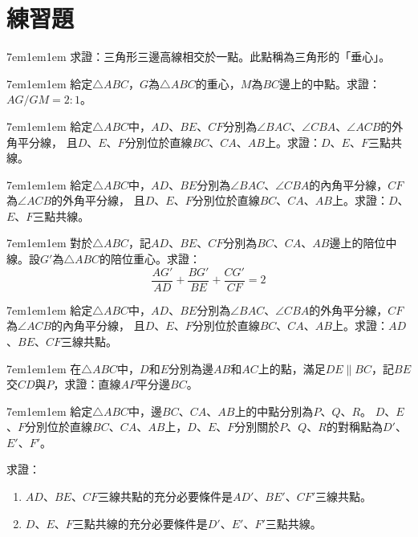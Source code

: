 \documentclass[12pt]{article}
\begin{document}
\section{練習題}
\begin{mybox}[Problem 1]{7em}{1em}{1em}
   求證：三角形三邊高線相交於一點。此點稱為三角形的「垂心」。
\end{mybox}
\begin{mybox}[Problem 2]{7em}{1em}{1em}
   給定$\triangle{ABC}$，$G$為$\triangle{ABC}$的重心，$M$為$BC$邊上的中點。求證：$AG/GM=2:1$。
\end{mybox}
\begin{mybox}[Problem 3]{7em}{1em}{1em}
   給定$\triangle{ABC}$中，$AD$、$BE$、$CF$分別為$\angle{BAC}$、$\angle{CBA}$、$\angle{ACB}$的外角平分線，
   且$D$、$E$、$F$分別位於直線$BC$、$CA$、$AB$上。求證：$D$、$E$、$F$三點共線。
\end{mybox}
\begin{mybox}[Problem 4]{7em}{1em}{1em}
   給定$\triangle{ABC}$中，$AD$、$BE$分別為$\angle{BAC}$、$\angle{CBA}$的內角平分線，$CF$為$\angle{ACB}$的外角平分線，
   且$D$、$E$、$F$分別位於直線$BC$、$CA$、$AB$上。求證：$D$、$E$、$F$三點共線。
\end{mybox}
\begin{mybox}[Problem 5]{7em}{1em}{1em}
   對於$\triangle{ABC}$，記$AD$、$BE$、$CF$分別為$BC$、$CA$、$AB$邊上的陪位中線。設$G'$為$\triangle{ABC}$的陪位重心。求證：
   $$
   \frac{AG'}{AD}+\frac{BG'}{BE}+\frac{CG'}{CF}=2
   $$
\end{mybox}
\begin{mybox}[Problem 6]{7em}{1em}{1em}
   給定$\triangle{ABC}$中，$AD$、$BE$分別為$\angle{BAC}$、$\angle{CBA}$的外角平分線，$CF$為$\angle{ACB}$的內角平分線，
   且$D$、$E$、$F$分別位於直線$BC$、$CA$、$AB$上。求證：$AD$、$BE$、$CF$三線共點。
\end{mybox}
\begin{mybox}[Problem 7]{7em}{1em}{1em}
   在$\triangle{ABC}$中，$D$和$E$分別為邊$AB$和$AC$上的點，滿足$DE\parallel BC$，記$BE$交$CD$與$P$，求證：直線$AP$平分邊$BC$。
\end{mybox}
\begin{mybox}[Problem 8]{7em}{1em}{1em}
   給定$\triangle{ABC}$中，邊$BC$、$CA$、$AB$上的中點分別為$P$、$Q$、$R$。
   $D$、$E$、$F$分別位於直線$BC$、$CA$、$AB$上，$D$、$E$、$F$分別關於$P$、$Q$、$R$的對稱點為$D'$、$E'$、$F'$。

   求證：
   \begin{enumerate}[label=(\roman*)]
       \item $AD$、$BE$、$CF$三線共點的充分必要條件是$AD'$、$BE'$、$CF'$三線共點。
       \item $D$、$E$、$F$三點共線的充分必要條件是$D'$、$E'$、$F'$三點共線。
   \end{enumerate}
\end{mybox}
\end{document}
